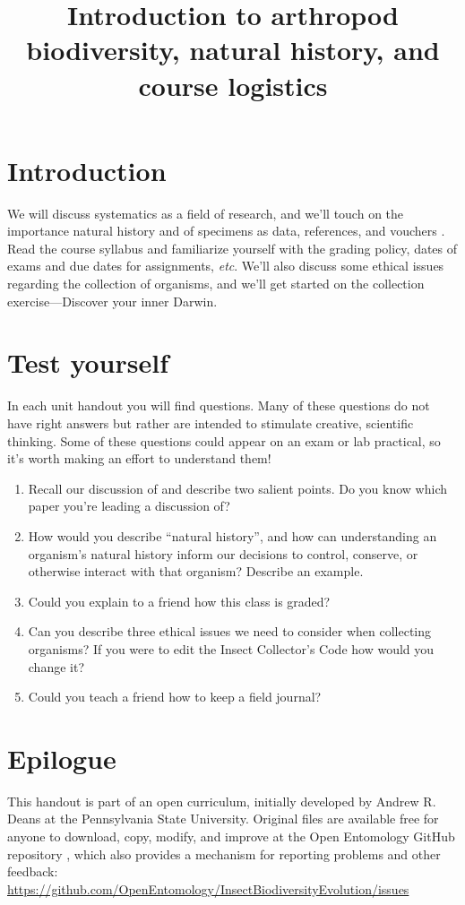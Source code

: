 \documentclass[11pt,letterpaper]{article}
\title{Introduction to arthropod biodiversity, natural history, and course logistics}
\author{}
\begin{document}
\cleanlookdateon %
\maketitle
\thispagestyle{fancy}
\section*{Introduction}
We will discuss systematics as a field of research, and we'll touch on the importance natural history and of specimens as data, references, and vouchers \citep{vouchers}. Read the course syllabus and familiarize yourself with the grading policy, dates of exams and due dates for assignments, \textit{etc}. We'll also discuss some ethical issues regarding the collection of organisms, and we'll get started on the collection exercise---Discover your inner Darwin.

\section*{Test yourself}
In each unit handout you will find questions. Many of these questions do not have right answers but rather are intended to stimulate creative, scientific thinking. Some of these questions could appear on an exam or lab practical, so it's worth making an effort to understand them!\\

\begin{enumerate}
\item Recall our discussion of \cite{Eisner1964} and describe two salient points. Do you know which paper you're leading a discussion of?
\item How would you describe ``natural history'', and how can understanding an organism's natural history inform our decisions to control, conserve, or otherwise interact with that organism? Describe an example.
\item Could you explain to a friend how this class is graded?
\item Can you describe three ethical issues we need to consider when collecting organisms? If you were to edit the Insect Collector's Code \citep{oath} how would you change it?
\item Could you teach a friend how to keep a field journal?
\end{enumerate}


\clearpage
\section*{Epilogue}
This handout is part of an open curriculum, initially developed by Andrew R. Deans at the Pennsylvania State University. Original files are available free for anyone to download, copy, modify, and improve at the Open Entomology GitHub repository \citep{ENT532}, which also provides a mechanism for reporting problems and other feedback:\\
\url{https://github.com/OpenEntomology/InsectBiodiversityEvolution/issues}



\end{document}
